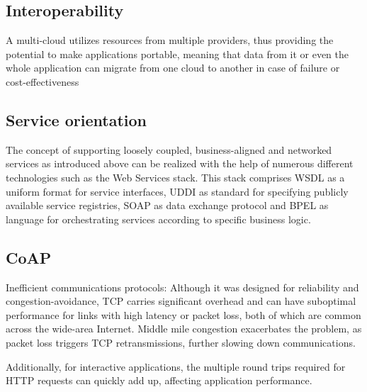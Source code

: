 \documentclass{ieeeaccess}
\begin{document}
\subsection{Interoperability}

A multi-cloud utilizes resources from multiple providers, thus providing the potential to make applications portable, meaning that data from it or even the whole application can migrate from one cloud to another in case of failure or cost-effectiveness

\subsection{Service orientation}

The concept of supporting loosely coupled, business-aligned and networked services as introduced above can be realized with the help of numerous different technologies such as the Web Services stack. This stack comprises WSDL as a uniform format for service interfaces, UDDI as standard for specifying publicly available service registries, SOAP as data exchange protocol and BPEL as language for orchestrating services according to specific business logic.

\subsection{CoAP}

Inefficient communications protocols: Although it was designed for reliability and congestion-avoidance, TCP carries significant overhead and can have suboptimal performance for links with high latency or packet loss, both of which are common across the wide-area Internet. Middle mile congestion exacerbates the problem, as packet loss triggers TCP retransmissions, further slowing down communications.

Additionally, for interactive applications, the multiple round trips required for HTTP requests can quickly add up, affecting application performance.

\end{document}
